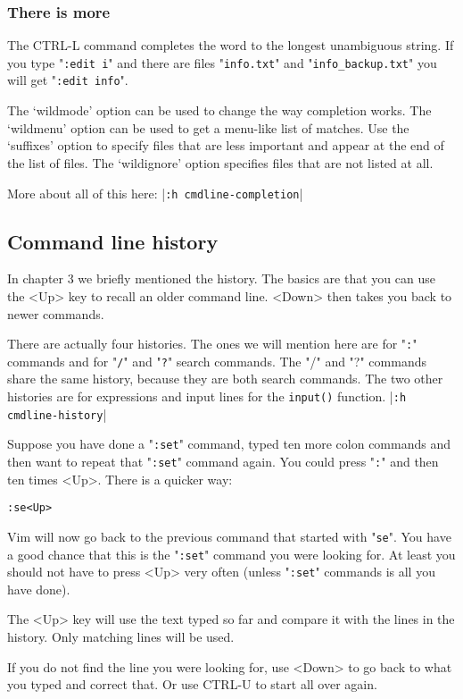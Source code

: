 \subsubsection{There is more}
The CTRL-L command completes the word to the longest unambiguous string.
If you type "\verb!:edit i!" and there are files "\verb!info.txt!" and "\verb!info_backup.txt!" you will get "\verb!:edit info!".

The `wildmode' option can be used to change the way completion works.
The `wildmenu' option can be used to get a menu-like list of matches.
Use the `suffixes' option to specify files that are less important and appear at the end of the list of files.
The `wildignore' option specifies files that are not listed at all.

More about all of this here: |\verb!:h cmdline-completion!|
\subsection{Command line history}
In chapter 3 we briefly mentioned the history.
The basics are that you can use the <Up> key to recall an older command line.
<Down> then takes you back to newer commands.

There are actually four histories.
The ones we will mention here are for "\verb!:!" commands and for "\verb!/!" and "\verb!?!" search commands.
The "/" and "?" commands share the same history, because they are both search commands.
The two other histories are for expressions and input lines for the \verb!input()! function.
|\verb!:h cmdline-history!|

Suppose you have done a "\verb!:set!" command, typed ten more colon commands and then want to repeat that "\verb!:set!" command again.
You could press "\verb!:!" and then ten times <Up>.
There is a quicker way:

\begin{Verbatim}[samepage=true]
 :se<Up>
\end{Verbatim}

Vim will now go back to the previous command that started with "\verb!se!".
You have a good chance that this is the "\verb!:set!" command you were looking for.
At least you should not have to press <Up> very often (unless "\verb!:set!" commands is all you have done).

The <Up> key will use the text typed so far and compare it with the lines in the history.
Only matching lines will be used.

If you do not find the line you were looking for, use <Down> to go back to what you typed and correct that.
Or use CTRL-U to start all over again.

